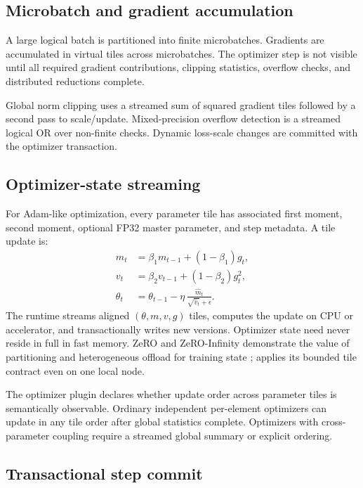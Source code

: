 \subsection{Microbatch and gradient accumulation}

A large logical batch is partitioned into finite microbatches. Gradients are accumulated in virtual tiles across microbatches. The optimizer step is not visible until all required gradient contributions, clipping statistics, overflow checks, and distributed reductions complete.

Global norm clipping uses a streamed sum of squared gradient tiles followed by a second pass to scale/update. Mixed-precision overflow detection is a streamed logical OR over non-finite checks. Dynamic loss-scale changes are committed with the optimizer transaction.

\subsection{Optimizer-state streaming}

For Adam-like optimization, every parameter tile has associated first moment, second moment, optional FP32 master parameter, and step metadata. A tile update is:
\begin{align}
  m_t &= \beta_1m_{t-1}+(1-\beta_1)g_t,\\
  v_t &= \beta_2v_{t-1}+(1-\beta_2)g_t^2,\\
  \theta_t &= \theta_{t-1}-\eta\,
  \frac{\widehat m_t}{\sqrt{\widehat v_t}+\epsilon}.
\end{align}
The runtime streams aligned $(\theta,m,v,g)$ tiles, computes the update on CPU or accelerator, and transactionally writes new versions. Optimizer state need never reside in full in fast memory. ZeRO and ZeRO-Infinity demonstrate the value of partitioning and heterogeneous offload for training state \cite{rajbhandari2020zero,rajbhandari2021zeroinfinity}; \AMS applies its bounded tile contract even on one local node.

The optimizer plugin declares whether update order across parameter tiles is semantically observable. Ordinary independent per-element optimizers can update in any tile order after global statistics complete. Optimizers with cross-parameter coupling require a streamed global summary or explicit ordering.

\subsection{Transactional step commit}

